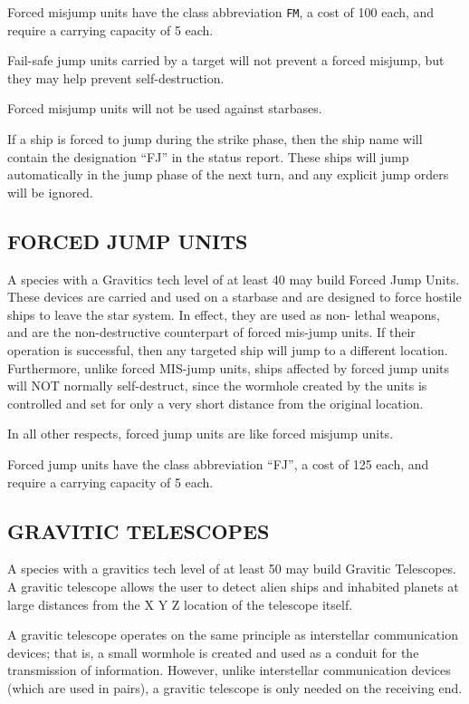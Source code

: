 \documentclass[10pt,titlepage]{article}
\begin{document}
Forced misjump units have the class abbreviation \texttt{FM}, a cost of 100 each, and
require a carrying capacity of 5 each.

Fail-safe jump units carried by a target will not prevent a forced misjump,
but they may help prevent self-destruction.

Forced misjump units will not be used against starbases.

If a ship is forced to jump during the strike phase, then the ship name will
contain the designation ``FJ'' in the status report.  These ships will jump
automatically in the jump phase of the next turn, and any explicit jump orders
will be ignored.

\subsection{FORCED JUMP UNITS}

A species with a Gravitics tech level of at least 40 may build Forced Jump
Units.  These devices are carried and used on a starbase and are designed to
force hostile ships to leave the star system.  In effect, they are used as non-
lethal weapons, and are the non-destructive counterpart of forced mis-jump
units.  If their operation is successful, then any targeted ship will jump to a
different location.  Furthermore, unlike forced MIS-jump units, ships affected
by forced jump units will NOT normally self-destruct, since the wormhole
created by the units is controlled and set for only a very short distance
from the original location.

In all other respects, forced jump units are like forced misjump units.

Forced jump units have the class abbreviation ``FJ'', a cost of 125 each, and
require a carrying capacity of 5 each.

\subsection{GRAVITIC TELESCOPES}

A species with a gravitics tech level of at least 50 may build Gravitic
Telescopes.  A gravitic telescope allows the user to detect alien ships and
inhabited planets at large distances from the X Y Z location of the telescope
itself.

A gravitic telescope operates on the same principle as interstellar
communication devices; that is, a small wormhole is created and used as a
conduit for the transmission of information.  However, unlike interstellar
communication devices (which are used in pairs), a gravitic telescope is only
needed on the receiving end.
\end{document}
